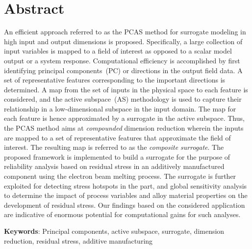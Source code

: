 \section*{Abstract}

An efficient approach referred to as the PCAS method for surrogate modeling in high input and output dimensions is 
proposed. Specifically, a large
collection of input variables is mapped to a field of interest as opposed to a scalar model output or a system response.
Computational efficiency is accomplished by first identifying principal components~(PC)
or directions in  the output field data. A set of representative features corresponding to the important directions is 
determined. A map from the set of inputs in the physical space to each feature is considered,
and the active subspace~(AS) methodology is used to capture their relationship in a low-dimensional subspace in the input 
domain. The map for each feature is hence approximated by a surrogate in the active subspace. Thus, the PCAS
method aims at \textit{compounded} dimension reduction wherein the inputs are mapped to a set of representative features
that approximate the field of interest. The resulting map is referred to as the \textit{composite surrogate}.
The proposed framework is implemented to build a surrogate for the purpose of reliability analysis
based on residual stress in an additively
manufactured component using the electron beam melting process. The surrogate is further exploited for detecting 
stress hotspots in the part, and global sensitivity analysis to determine the impact of process variables and
alloy material properties on the development of residual stress. Our findings based on the considered application
are indicative of enormous potential for computational gains for such analyses. 

\bigskip

\noindent \textbf{Keywords}: Principal components, active subspace, surrogate, dimension reduction,
residual stress, additive manufacturing
